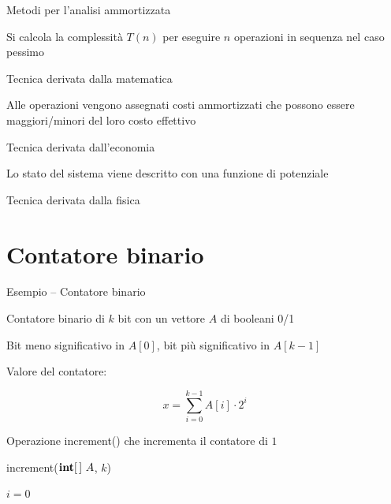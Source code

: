 \begin{frame}{Metodi per l'analisi ammortizzata}

\vspace{-9pt}
\small
\begin{myboxtitle}
\BI
\item Si calcola la complessità $T(n)$ per eseguire $n$ operazioni in sequenza nel \alert{caso pessimo}
\item Tecnica derivata dalla matematica
\EI
\end{myboxtitle}
\begin{myboxtitle}
\BI
\item Alle operazioni vengono assegnati \alert{costi ammortizzati} che possono essere maggiori/minori del loro costo effettivo
\item Tecnica derivata dall'economia
\EI
\end{myboxtitle}
\begin{myboxtitle}
\BI
\item Lo stato del sistema viene descritto con una \alert{funzione di potenziale}
\item Tecnica derivata dalla fisica	
\EI
\end{myboxtitle}

\end{frame}


\section{Contatore binario}	

\begin{frame}[shrink=10]{Esempio -- Contatore binario}

\vspace{-9pt}
\begin{myboxtitle}
\BI
\item Contatore binario di $k$ bit con un vettore $A$ di booleani 0/1
\item Bit meno significativo in $A[0]$, bit più significativo in $A[k-1]$
\item Valore del contatore: \parbox[c]{6cm}{{ \[x = \sum_{i=0}^{k-1} A[i] \cdot 2^i\]}}
\vspace{-4pt}
\item Operazione \textsf{increment}() che incrementa il contatore di $1$
\EI
\end{myboxtitle}

\smallskip
\begin{Procedure}
\caption[A]{\textsf{increment}($\INTARRAY\ A$, \INTEGER $k$)}
\INTEGER $i = 0$\;
\end{Procedure}

\end{frame}



